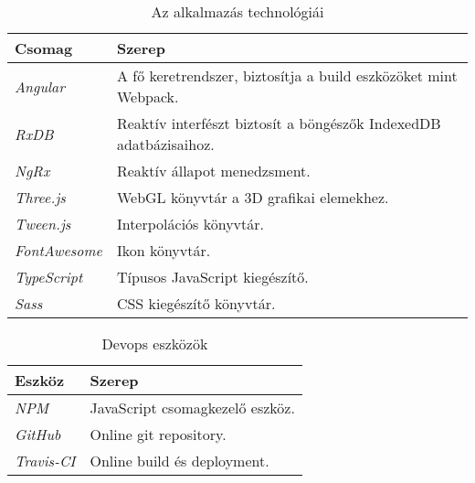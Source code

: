\begin{table}[H]
	\centering
	\begin{tabular}{ | m{} | m{} | }
		\hline
		\textbf{Csomag} & \textbf{Szerep} \\
		\hline \hline
		\emph{Angular} \cite{Angular} & A fő keretrendszer, biztosítja a build eszközöket mint Webpack. \\
		\hline
		\emph{RxDB} \cite{RxDB} & Reaktív interfészt biztosít a böngészők IndexedDB adatbázisaihoz. \\
		\hline
		\emph{NgRx} \cite{NgRx} & Reaktív állapot menedzsment. \\
		\hline
		\emph{Three.js} \cite{Three} & WebGL könyvtár a 3D grafikai elemekhez. \\
		\hline
		\emph{Tween.js} \cite{Tween} & Interpolációs könyvtár. \\
		\hline
		\emph{FontAwesome} \cite{FontAwesome} & Ikon könyvtár.  \\
		\hline
		\emph{TypeScript} \cite{TypeScript} & Típusos JavaScript kiegészítő.  \\
		\hline

		\emph{Sass} \cite{Sass} & CSS kiegészítő könyvtár.  \\
		\hline
	\end{tabular}
	\caption{Az alkalmazás technológiái}
	\label{tab:technologies}
\end{table}

\begin{table}[H]
	\centering
	\begin{tabular}{ | m{} | m{} | }
		\hline
		\textbf{Eszköz} & \textbf{Szerep} \\
		\hline \hline
		\emph{NPM} \cite{NPM} & JavaScript csomagkezelő eszköz.  \\
		\hline
		\emph{GitHub} \cite{Github} & Online git repository.  \\
		\hline
		\emph{Travis-CI} \cite{Travis} & Online build és deployment.  \\
		\hline
	\end{tabular}
	\caption{Devops eszközök}
	\label{tab:technologies}
\end{table}
